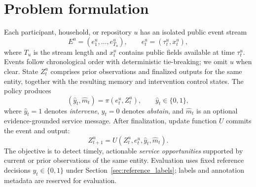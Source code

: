 \section{Problem formulation}
\label{sec:problem}

Each participant, household, or repository $u$ has an isolated public event stream
\begin{equation}
E^u=(e^u_1,\ldots,e^u_{T_u}), \qquad
e^u_t=(\tau^u_t,x^u_t),
\label{eq:event_stream}
\end{equation}
where $T_u$ is the stream length and $x^u_t$ contains public fields available at time $\tau^u_t$.
Events follow chronological order with deterministic tie-breaking; we omit $u$ when clear.
State $Z^u_t$ comprises prior observations and finalized outputs for the same entity, together with the resulting memory and intervention control states.
The policy produces
\begin{equation}
(\hat y_t,\hat m_t)=\pi(e^u_t,Z^u_t),
\qquad \hat y_t\in\{0,1\},
\label{eq:generic_decision}
\end{equation}
where $\hat y_t=1$ denotes \emph{intervene}, $\hat y_t=0$ denotes \emph{abstain}, and $\hat m_t$ is an optional evidence-grounded service message.
After finalization, update function $U$ commits the event and output:
\begin{equation}
Z^u_{t+1}=U(Z^u_t,e^u_t,\hat y_t,\hat m_t).
\label{eq:causal_update}
\end{equation}
The objective is to detect timely, actionable \emph{service opportunities} supported by current or prior observations of the same entity.
Evaluation uses fixed reference decisions $y_t\in\{0,1\}$ under Section~\ref{sec:reference_labels}; labels and annotation metadata are reserved for evaluation.
